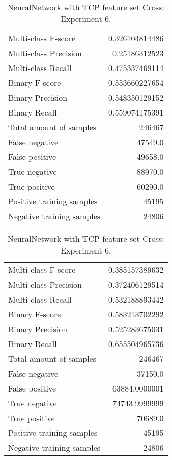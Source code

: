 \begin{table}[H]
\begin{minipage}{0.5\textwidth}
\caption{NeuralNetwork with TCP feature set Cross: \\Experiment 5.}
\centering
\begin{tabular}{l r}
\toprule
Multi-class F-score & 0.326104814486 \\
Multi-class Precision & 0.25186312523 \\
Multi-class Recall & 0.475337469114 \\
\midrule
Binary F-score & 0.553660227654 \\
Binary Precision & 0.548350129152 \\
Binary Recall & 0.559074175391 \\
\midrule
Total amount of samples & 246467 \\
False negative & 47549.0 \\
False positive & 49658.0 \\
True negative & 88970.0 \\
True positive & 60290.0 \\
\midrule
Positive training samples & 45195 \\
Negative training samples & 24806 \\
\bottomrule
\end{tabular}
\end{minipage}
\hfillx
\begin{minipage}{0.5\textwidth}
\caption{NeuralNetwork with TCP feature set Cross: \\Experiment 6.}
\centering
\begin{tabular}{l r}
\toprule
Multi-class F-score & 0.385157389632 \\
Multi-class Precision & 0.372406129514 \\
Multi-class Recall & 0.532188893442 \\
\midrule
Binary F-score & 0.583213702292 \\
Binary Precision & 0.525283675031 \\
Binary Recall & 0.655504965736 \\
\midrule
Total amount of samples & 246467 \\
False negative & 37150.0 \\
False positive & 63884.0000001 \\
True negative & 74743.9999999 \\
True positive & 70689.0 \\
\midrule
Positive training samples & 45195 \\
Negative training samples & 24806 \\
\bottomrule
\end{tabular}
\end{minipage}
\end{table}
